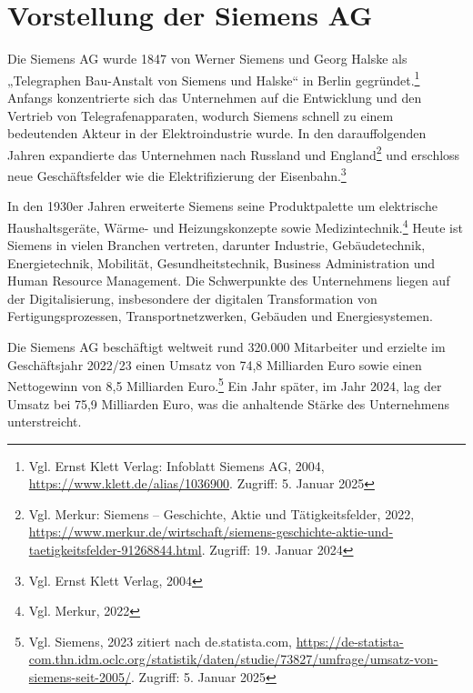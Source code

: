\chapter{Vorstellung der Siemens AG}\label{ch:data}

Die Siemens AG wurde 1847 von Werner Siemens und Georg Halske als „Telegraphen Bau-Anstalt von Siemens und Halske“ in Berlin 
gegründet.\footnote{Vgl. Ernst Klett Verlag: Infoblatt Siemens AG, 2004, \url{https://www.klett.de/alias/1036900}. Zugriff: 5. Januar 2025} 
Anfangs konzentrierte sich das Unternehmen auf die Entwicklung und den Vertrieb von Telegrafenapparaten, wodurch Siemens schnell zu einem 
bedeutenden Akteur in der Elektroindustrie wurde. In den darauffolgenden Jahren expandierte das Unternehmen nach Russland und 
England\footnote{Vgl. Merkur: Siemens – Geschichte, Aktie und Tätigkeitsfelder, 2022, \url{https://www.merkur.de/wirtschaft/siemens-geschichte-aktie-und-taetigkeitsfelder-91268844.html}. Zugriff: 19. Januar 2024} 
und erschloss neue Geschäftsfelder wie die Elektrifizierung der Eisenbahn.\footnote{Vgl. Ernst Klett Verlag, 2004}

In den 1930er Jahren erweiterte Siemens seine Produktpalette um elektrische Haushaltsgeräte, Wärme- und Heizungskonzepte sowie 
Medizintechnik.\footnote{Vgl. Merkur, 2022} Heute ist Siemens in vielen Branchen vertreten, darunter Industrie, Gebäudetechnik, Energietechnik, 
Mobilität, Gesundheitstechnik, Business Administration und Human Resource Management. Die Schwerpunkte des Unternehmens liegen auf der 
Digitalisierung, insbesondere der digitalen Transformation von Fertigungsprozessen, Transportnetzwerken, Gebäuden und Energiesystemen.

Die Siemens AG beschäftigt weltweit rund 320.000 Mitarbeiter und erzielte im Geschäftsjahr 2022/23 einen Umsatz von 74,8 Milliarden Euro sowie 
einen Nettogewinn von 8,5 Milliarden Euro.\footnote{Vgl. Siemens, 2023 zitiert nach de.statista.com, 
\url{https://de-statista-com.thn.idm.oclc.org/statistik/daten/studie/73827/umfrage/umsatz-von-siemens-seit-2005/}. Zugriff: 5. Januar 2025} 
Ein Jahr später, im Jahr 2024, lag der Umsatz bei 75,9 Milliarden Euro, was die anhaltende Stärke des Unternehmens unterstreicht.